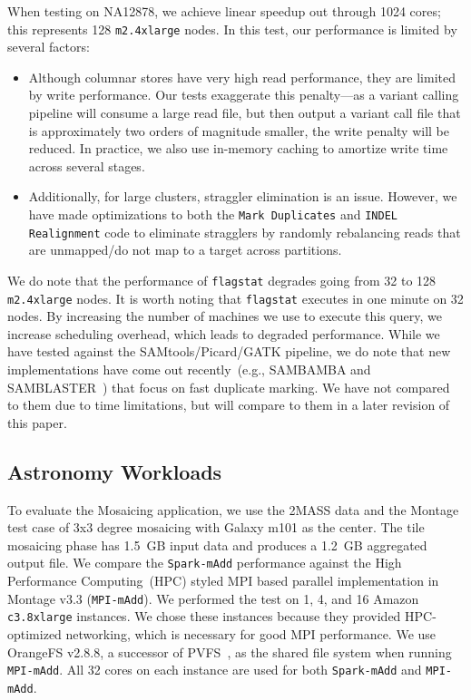 \documentclass{acm_proc_article-sp}
\begin{document}
When testing on NA12878, we achieve linear speedup out through 1024 cores; this represents 128
\texttt{m2.4xlarge} nodes. In this test, our performance is limited by several factors:

\begin{itemize}
\item Although columnar stores have very high read performance, they are limited by write performance. Our
tests exaggerate this penalty---as a variant calling pipeline will consume a large read file, but then output a
variant call file that is approximately two orders of magnitude smaller, the write penalty will be reduced. In
practice, we also use in-memory caching to amortize write time across several stages.
\item Additionally, for large clusters, straggler elimination is an issue. However, we have made optimizations to
both the \texttt{Mark Duplicates} and \texttt{INDEL Realignment} code to eliminate stragglers by randomly
rebalancing reads that are unmapped/do not map to a target across partitions.
\end{itemize}

We do note that the performance of \texttt{flagstat} degrades going from 32 to 128 \texttt{m2.4xlarge} nodes.
It is worth noting that \texttt{flagstat} executes in one minute on 32 nodes. By increasing the number of machines
we use to execute this query, we increase scheduling overhead, which leads to degraded performance. While we
have tested against the SAMtools/Picard/GATK pipeline, we do note that new implementations have come out
recently~(e.g., SAMBAMBA and SAMBLASTER~\cite{faust14}) that focus on fast duplicate marking. We have not
compared to them due to time limitations, but will compare to them in a later revision of this paper.

\subsection{Astronomy Workloads}
\label{sec:astro-workloads}

To evaluate the Mosaicing application, we use the 2MASS data and the Montage test case of 3x3 degree
mosaicing with Galaxy m101 as the center. The tile mosaicing phase has 1.5~GB input data and produces a
1.2~GB aggregated output file. We compare the \texttt{Spark-mAdd} performance against the High Performance
Computing~(HPC) styled MPI based parallel implementation in Montage v3.3 (\texttt{MPI-mAdd}). We performed
the test on 1, 4, and 16 Amazon \texttt{c3.8xlarge} instances. We chose these instances because they provided
HPC-optimized networking, which is necessary for good MPI performance. We use OrangeFS
v2.8.8, a successor of PVFS~\cite{PVFS}, as the shared file system when running \texttt{MPI-mAdd}. All
32 cores on each instance are used for both \texttt{Spark-mAdd} and \texttt{MPI-mAdd}.
\end{document}
